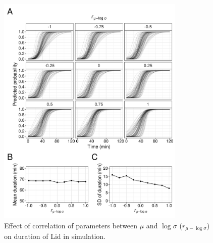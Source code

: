 \documentclass[a4paper,11pt]{article}
\begin{document}
\begin{figure}[htbp]
 \centering
 \includegraphics[width=0.8\textwidth]{Fig/Fig3.pdf}
 \caption{Effect of correlation of parameters
           between $\mu$ and $\log \sigma$ ($r_{\mu - \log \sigma}$)
           on duration of Lid in simulation.}
 \label{fig3}
\end{figure}

\clearpage
\end{document}
